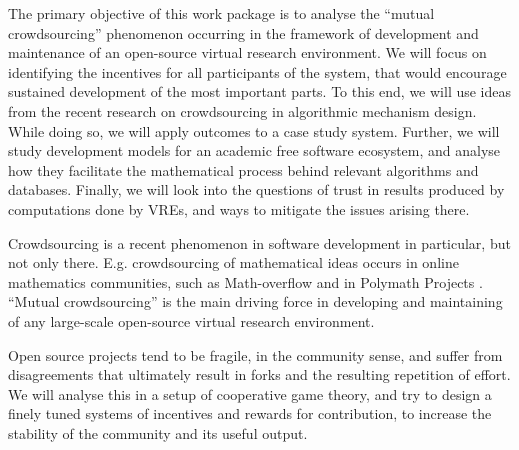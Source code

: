 \begin{workpackage}[id=social-aspects,wphases=1-48!.5,
  title=Social Aspects,
  lead=UO,
  UORM=1,USHRM=8, USORM=5]


\begin{wpobjectives}

The primary objective of this work package is to analyse the ``mutual crowdsourcing''
phenomenon occurring in the framework of development and maintenance of an open-source
virtual research environment.
We will focus on identifying the incentives for all
participants of the system, that would encourage sustained development of the
most important parts.  To this end, we will use ideas from the
recent research on crowdsourcing in algorithmic mechanism design.
While doing so, we will apply outcomes to a case study
system.
Further, we will study development models for an academic free software ecosystem,
and analyse how they facilitate the mathematical process behind
relevant  algorithms and databases.
Finally, we will look into the questions of trust in results produced
by computations done by VREs, and ways to mitigate the issues arising there.
\end{wpobjectives}

\begin{wpdescription}
Crowdsourcing is a recent phenomenon
in software development in particular, but not only there. E.g.
crowdsourcing of mathematical ideas occurs in online
mathematics communities, such as Math-overflow \cite{mathoverflow} and
in Polymath Projects \cite{polymath}.
``Mutual crowdsourcing'' is the main driving force
in developing and maintaining of any large-scale open-source
virtual research environment.

Open source projects tend to be fragile, in the community sense, and
suffer from disagreements that ultimately result in forks and
the resulting repetition of effort. We will analyse this in
a setup of cooperative game theory, and try to design
a finely tuned systems of incentives and rewards for contribution, to increase
the stability of the community and its useful output.


\end{wpdescription}
\end{workpackage}
